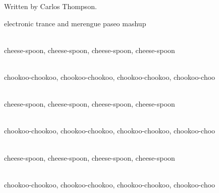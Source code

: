 
\begin{notes}
Written by Carlos Thompson.
\end{notes}
\begin{style}
electronic trance and merengue paseo mashup
\end{style}
\begin{lyrics}
\\
cheese-spoon, cheese-spoon, cheese-spoon, cheese-spoon

\\
chookoo-chookoo, chookoo-chookoo, chookoo-chookoo, chookoo-choo

\\
cheese-spoon, cheese-spoon, cheese-spoon, cheese-spoon

\\
chookoo-chookoo, chookoo-chookoo, chookoo-chookoo, chookoo-choo

\\
cheese-spoon, cheese-spoon, cheese-spoon, cheese-spoon

\\
chookoo-chookoo, chookoo-chookoo, chookoo-chookoo, chookoo-choo
\end{lyrics}

